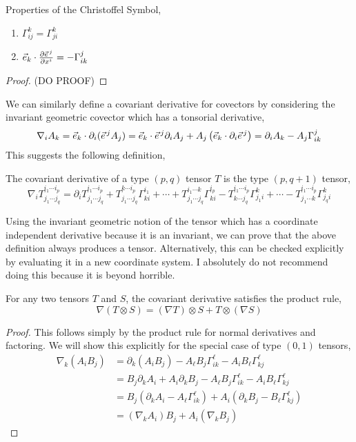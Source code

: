 \documentclass[11pt, a4paper]{article}
\begin{document}
\begin{lemma}
Properties of the Christoffel Symbol,
\begin{enumerate}
\item $\Gamma^k_{ij} = \Gamma^k_{ji}$

\item $\vec{e}_k \cdot \frac{\partial{\vec{e}^{\, j}}}{\partial{x^i}} = - \Gamma^{j}_{ik}$

\end{enumerate}
\end{lemma} 

\begin{proof}
(DO PROOF)
\end{proof}

We can similarly define a covariant derivative for covectors by considering the invariant geometric covector which has a tonsorial derivative,
\[ \nabla_i A_k =  \vec{e}_k \cdot \partial_i (\vec{e}^{\, j} A_j) = \vec{e}_{k} \cdot \vec{e}^{\, j} \partial_i A_j + A_j \left( \vec{e}_{k} \cdot \partial_i \vec{e}^{\, j} \right) = \partial_i A_k - A_j \Gamma^j_{ik} \]
This suggests the following definition,
\begin{definition}
The covariant derivative of a type $(p,q)$ tensor $T$ is the type $(p, q+1)$ tensor,
\[ \nabla_{i} T^{i_1 \cdots i_p}_{j_1 \cdots j_q} = \partial_i T^{i_1 \cdots i_p}_{j_1 \cdots  j_q} + T^{k \cdots i_p}_{j_1 \cdots j_q} \Gamma^{i_1}_{k i} + \cdots + T^{i_1 \cdots k}_{j_1 \cdots j_q} \Gamma^{i_p}_{k i} - T^{i_1 \cdots i_p}_{k \cdots  j_q} \Gamma^{k}_{j_1 i} + \cdots - T^{i_1 \cdots i_p}_{j_1 \cdots k} \Gamma^{k}_{j_q i} \]
\end{definition}
Using the invariant geometric notion of the tensor which has a coordinate independent derivative because it is an invariant, we can prove that the above definition always produces a tensor. Alternatively, this can be checked explicitly by evaluating it in  a new coordinate system. I absolutely do not recommend doing this because it is beyond horrible. 

\begin{lemma}
For any two tensors $T$ and $S$, the covariant derivative satisfies the product rule,
\[\nabla (T \otimes S) = (\nabla  T) \otimes S + T \otimes (\nabla S)\]
\end{lemma}

\begin{proof}
This follows simply by the product rule for normal derivatives and factoring. We will show this explicitly for the special case of type $(0, 1)$ tensors,
\begin{align*}
\nabla_k (A_i B_j) & = \partial_k (A_i B_j) - A_\ell B_j \Gamma^\ell_{i k} - A_i B_{\ell} \Gamma^\ell_{k j}
\\
& = B_j \partial_k A_i + A_i \partial_k B_j - A_\ell B_j \Gamma^\ell_{i k} - A_i B_{\ell} \Gamma^\ell_{k j}  
\\
& = B_j \left( \partial_k A_i - A_\ell \Gamma^\ell_{i k} \right) + A_i \left( \partial_k B_j - B_{\ell} \Gamma^\ell_{k j}  \right)
\\
& = (\nabla_k A_i) B_j + A_i (\nabla_k B_j)
\end{align*}
\end{proof}
\end{document}
